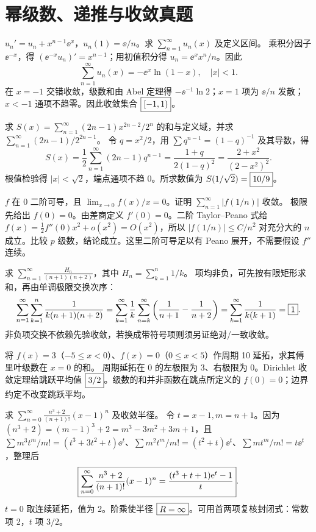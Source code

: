 \section{幂级数、递推与收敛真题}
$u_n'=u_n+x^{n-1}\ee^x$，$u_n(1)=\ee/n$。求 $\sum_{n=1}^\infty u_n(x)$ 及定义区间。
\sol 乘积分因子 $\ee^{-x}$，得 $(\ee^{-x}u_n)'=x^{n-1}$；用初值积分得 $u_n=\ee^x x^n/n$。因此
\[
\sum_{n=1}^\infty u_n(x)=-\ee^x\ln(1-x),\quad |x|<1.
\]
在 $x=-1$ 交错收敛，级数和由 Abel 定理得 $-\ee^{-1}\ln2$；$x=1$ 项为 $\ee/n$ 发散；$x<-1$ 通项不趋零。因此收敛集合 $\boxed{[-1,1)}$。

求 $S(x)=\sum_{n=1}^\infty(2n-1)x^{2n-2}/2^n$ 的和与定义域，并求 $\sum_{n=1}^\infty(2n-1)/2^{2n-1}$。
\sol 令 $q=x^2/2$，用 $\sum q^{n-1}=(1-q)^{-1}$ 及其导数，得
\[
S(x)=\frac12\sum_{n=1}^\infty(2n-1)q^{n-1}
=\frac{1+q}{2(1-q)^2}=\frac{2+x^2}{(2-x^2)^2}.
\]
根值检验得 $|x|<\sqrt2$，端点通项不趋 0。所求数值为 $S(1/\sqrt2)=\boxed{10/9}$。

$f$ 在 0 二阶可导，且 $\lim_{x\to0}f(x)/x=0$。证明 $\sum_{n=1}^\infty|f(1/n)|$ 收敛。
\sol 极限先给出 $f(0)=0$。由差商定义 $f'(0)=0$。二阶 Taylor--Peano 式给
$f(x)=\frac12f''(0)x^2+o(x^2)=O(x^2)$，所以 $|f(1/n)|\le C/n^2$ 对充分大的 $n$ 成立。比较 $p$ 级数，结论成立。这里二阶可导足以有 Peano 展开，不需要假设 $f''$ 连续。

求 $\displaystyle\sum_{n=1}^\infty\frac{H_n}{(n+1)(n+2)}$，其中 $H_n=\sum_{k=1}^n1/k$。
\sol 项均非负，可先按有限矩形求和，再由单调极限交换次序：
\[
\sum_{n=1}^\infty\sum_{k=1}^n\frac1{k(n+1)(n+2)}
=\sum_{k=1}^\infty\frac1k\sum_{n=k}^\infty\left(\frac1{n+1}-\frac1{n+2}\right)
=\sum_{k=1}^\infty\frac1{k(k+1)}=\boxed{1}.
\]
非负项交换不依赖先验收敛，若换成带符号项则须另证绝对/一致收敛。

将 $f(x)=3$（$-5\le x<0$）、$f(x)=0$（$0\le x<5$）作周期 10 延拓，求其傅里叶级数在 $x=0$ 的和。
\sol 周期延拓在 0 的左极限为 3、右极限为 0。Dirichlet 收敛定理给跳跃平均值 $\boxed{3/2}$。级数的和并非函数在跳点所定义的 $f(0)=0$；边界约定不改变跳跃平均。

求 $\displaystyle\sum_{n=0}^\infty\frac{n^3+2}{(n+1)!}(x-1)^n$ 及收敛半径。
\sol 令 $t=x-1,m=n+1$。因为 $(n^3+2)=(m-1)^3+2=m^3-3m^2+3m+1$，且
$\sum m^3t^m/m!=(t^3+3t^2+t)\ee^t$、$\sum m^2t^m/m!=(t^2+t)\ee^t$、$\sum mt^m/m!=t\ee^t$，整理后
\[
\boxed{\sum_{n=0}^\infty\frac{n^3+2}{(n+1)!}(x-1)^n
=\frac{(t^3+t+1)\mathrm e^t-1}{t}}.
\]
$t=0$ 取连续延拓，值为 2。阶乘使半径 $\boxed{R=\infty}$。可用首两项复核封闭式：常数项 2，$t$ 项 $3/2$。

